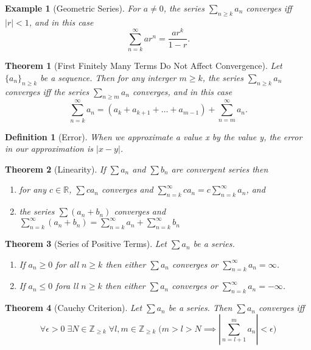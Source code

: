 \documentclass[11pt, oneside]{book}
\theoremstyle{break}
\newtheorem{thm}{Theorem}[section]
\newtheorem{defn}{Definition}[section]
\newtheorem{eg}{Example}[section]
\newcommand{\bb}[1]{\mathbb{#1}}		%
\begin{document}
\begin{eg}[Geometric Series]
	For $a \neq 0$, the series $\sum_{n \geq k} a_n$ converges iff $|r| < 1$, and in this case
	\[
		\sum_{n = k}^{\infty} ar^n = \frac{ar^k}{1 - r}.
	\]
\end{eg}

\begin{thm}[First Finitely Many Terms Do Not Affect Convergence]
	Let $\{a_n\}_{n \geq k}$ be a sequence. Then for any interger $m \geq k$, the series $\sum_{n \geq k} a_n$ converges iff the series $\sum_{n \geq m} a_n$ converges, and in this case
	\[
		\sum_{n = k}^{\infty} a_n = (a_k + a_{k + 1} + \hdots + a_{m - 1}) + \sum_{n = m}^{\infty} a_n.
	\]
\end{thm}

\begin{defn}[Error]
	When we approximate a value x by the value y, the error in our approximation is $|x - y|$.
\end{defn}

\begin{thm}[Linearity]
	If $\sum a_n$ and $\sum b_n$ are convergent series then
	\begin{enumerate}
		\item for any $c \in \bb{R}$, $\sum ca_n$ converges and $\sum\limits_{n=k}^{\infty} ca_n = c \sum\limits_{n=k}^{\infty} a_n$, and
		\item the series $\sum (a_n + b_n)$ converges and $\sum\limits_{n=k}^{\infty} (a_n + b_n) = \sum\limits_{n=k}^{\infty} a_n + \sum\limits_{n=k}^{\infty} b_n$
	\end{enumerate}
\end{thm}

\begin{thm}[Series of Positive Terms]
	Let $\sum a_n$ be a series.
	\begin{enumerate}
		\item If $a_n \geq 0$ for all $n \geq k$ then either $\sum a_n$ converges or $\sum\limits_{n = k}^{\infty} a_n = \infty$.
		\item If $a_n \leq 0$ fora ll $n \geq k$ then either $\sum a_n$ converges or $\sum\limits_{n = k}^{\infty} a_n = -\infty$.
	\end{enumerate}
\end{thm}

\begin{thm}[Cauchy Criterion]
	Let $\sum a_n$ be a series. Then $\sum a_n$ converges iff
	\[
		\forall \epsilon > 0 \; \exists N \in \bb{Z}_{\geq k} \; \forall l, m \in \bb{Z}_{\geq k} \; \Bigg(m > l > N \implies \left|\sum_{n = l +1}^{m} a_n \right| < \epsilon \Bigg)
	\]
\end{thm}
\end{document}
